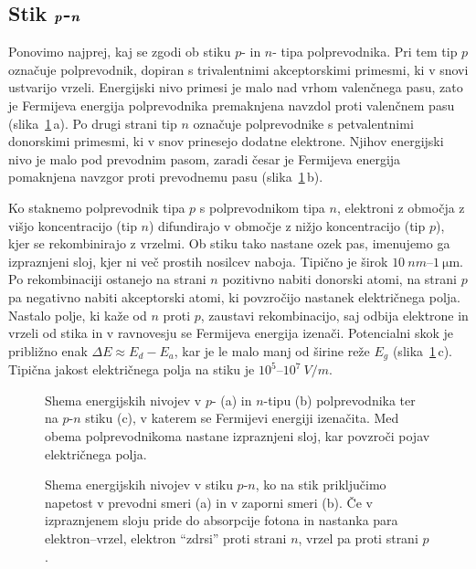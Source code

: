 \subsection*{Stik $\textbf{\textit{p}}$-$\textbf{\textit{n}}$}
Ponovimo najprej, kaj se zgodi ob stiku $p$- in $n$- tipa polprevodnika. Pri tem tip $p$ označuje
polprevodnik, dopiran s trivalentnimi akceptorskimi primesmi, ki v snovi ustvarijo vrzeli.
Energijski nivo primesi je malo nad vrhom valenčnega pasu, zato je Fermijeva energija
polprevodnika premaknjena navzdol proti valenčnem pasu (slika~\ref{11_PN1}\,a). 
Po drugi strani tip $n$ označuje polprevodnike s petvalentnimi 
donorskimi primesmi, ki v snov prinesejo dodatne elektrone. Njihov energijski nivo je malo 
pod prevodnim pasom, zaradi česar je Fermijeva energija pomaknjena navzgor proti prevodnemu pasu
(slika~\ref{11_PN1}\,b).

Ko staknemo polprevodnik tipa $p$ s polprevodnikom tipa $n$, elektroni 
z območja z višjo koncentracijo (tip $n$) difundirajo v območje z nižjo koncentracijo
(tip $p$), kjer se rekombinirajo z vrzelmi. 
Ob stiku tako nastane ozek pas, imenujemo ga izpraznjeni sloj, kjer ni več 
prostih nosilcev naboja. Tipično je širok $10~\si{nm}$--$1~\si{\micro\metre}$.
Po rekombinaciji ostanejo na strani $n$ pozitivno nabiti donorski atomi, 
na strani $p$ pa negativno nabiti akceptorski atomi, ki povzročijo nastanek  
električnega polja. Nastalo polje, ki kaže od $n$ proti $p$, zaustavi rekombinacijo, saj odbija
elektrone in vrzeli od stika in v ravnovesju se Fermijeva energija izenači. Potencialni
skok je približno enak $\Delta E \approx E_d-E_a$, kar je le malo manj od 
širine reže $E_g$ (slika~\ref{11_PN1}\,c). Tipična jakost električnega polja na stiku
je $10^5$--$10^7~\si{V/m}$.

\begin{figure}[h]
\centering
\def\svgwidth{140truemm} 

\caption{Shema energijskih nivojev v $p$- (a) in $n$-tipu (b) polprevodnika ter na $p$-$n$ stiku (c), 
v katerem se Fermijevi energiji izenačita. Med obema polprevodnikoma nastane izpraznjeni sloj, kar 
povzroči pojav električnega polja.}
\label{11_PN1}
\end{figure}

\begin{figure}[h]
\centering
\def\svgwidth{140truemm} 

\caption{Shema energijskih nivojev v stiku $p$-$n$, ko na stik priključimo napetost
v prevodni smeri (a) in v zaporni smeri (b). Če v izpraznjenem sloju pride do absorpcije
fotona in nastanka para elektron--vrzel, elektron ``zdrsi'' proti strani $n$, vrzel pa proti
strani $p$.}
\label{11_PNU}
\end{figure}


